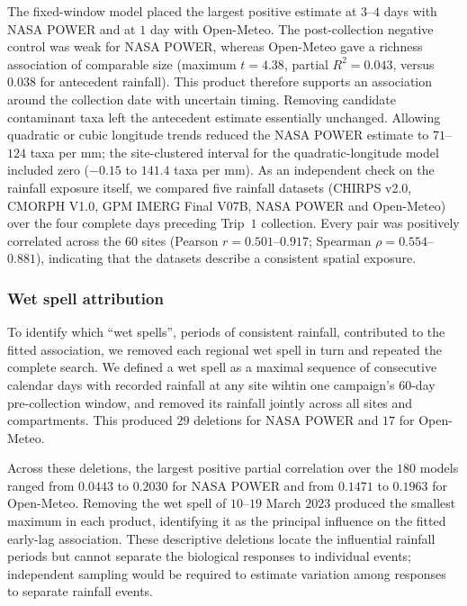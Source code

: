 \documentclass[11pt]{article}
\begin{document}
The fixed-window model placed the largest positive estimate at $3$--$4$ days with NASA POWER and at $1$ day with Open-Meteo. The post-collection negative control was weak for NASA POWER, whereas Open-Meteo gave a richness association of comparable size (maximum $t=4.38$, partial $R^2=0.043$, versus $0.038$ for antecedent rainfall). This product therefore supports an association around the collection date with uncertain timing. Removing candidate contaminant taxa left the antecedent estimate essentially unchanged. Allowing quadratic or cubic longitude trends reduced the NASA POWER estimate to $71$--$124$ taxa per mm; the site-clustered interval for the quadratic-longitude model included zero ($-0.15$ to $141.4$ taxa per mm). As an independent check on the rainfall exposure itself, we compared five rainfall datasets (CHIRPS v2.0, CMORPH V1.0, GPM IMERG Final V07B, NASA POWER and Open-Meteo) over the four complete days preceding Trip~$1$ collection. Every pair was positively correlated across the $60$ sites (Pearson $r = 0.501$--$0.917$; Spearman $\rho = 0.554$--$0.881$), indicating that the datasets describe a consistent spatial exposure.

\subsubsection{Wet spell attribution}
To identify which ``wet spells'', periods of consistent rainfall, contributed to the fitted association, we removed each regional wet spell in turn and repeated the complete search. We defined a wet spell as a maximal sequence of consecutive calendar days with recorded rainfall at any site wihtin one campaign's $60$-day pre-collection window, and removed its rainfall jointly across all sites and compartments. This produced $29$ deletions for NASA POWER and $17$ for Open-Meteo.

Across these deletions, the largest positive partial correlation over the $180$ models ranged from $0.0443$ to $0.2030$ for NASA POWER and from $0.1471$ to $0.1963$ for Open-Meteo. Removing the wet spell of $10$--$19$ March $2023$ produced the smallest maximum in each product, identifying it as the principal influence on the fitted early-lag association. These descriptive deletions locate the influential rainfall periods but cannot separate the biological responses to individual events; independent sampling would be required to estimate variation among responses to separate rainfall events.
\end{document}
